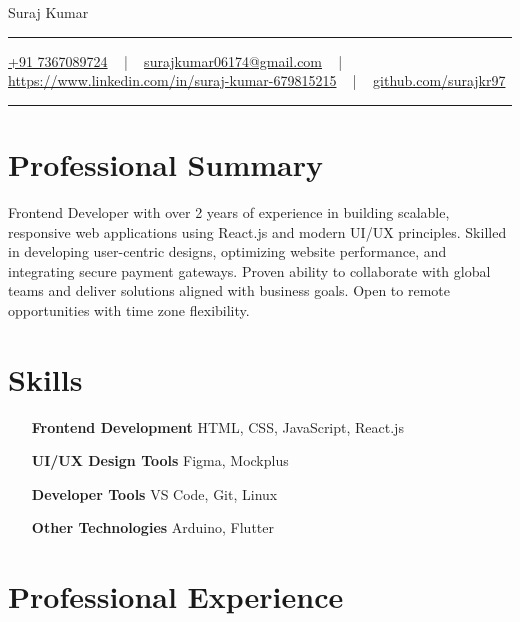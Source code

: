\documentclass[letterpaper,10pt]{article}
\newcommand{\documentTitle}[2]{
  \begin{center}
    {\Huge\color{accentTitle} #1}
    \vspace{10pt}
    {\color{accentLine} \hrule}
    \vspace{2pt}
    \footnotesize{#2}
    \vspace{2pt}
    {\color{accentLine} \hrule}
  \end{center}
}
\begin{document}
\documentTitle{Suraj Kumar}{
    \href{tel:+917367089724}{
      \raisebox{-0.05\height}{\faPhone} +91 7367089724} ~ | ~
    \href{mailto:surajkumar06174@gmail.com}{
      \raisebox{-0.15\height}{\faEnvelope} surajkumar06174@gmail.com} ~ | ~
    \href{https://linkedin.com/in/suraj-gupta-679815215}{
      \raisebox{-0.15\height}{\faLinkedin} https://www.linkedin.com/in/suraj-kumar-679815215} ~ | ~
    \href{https://github.com/surajkr97}{
      \raisebox{-0.15\height}{\faGithub} github.com/surajkr97}
}

  \section{Professional Summary}
  Frontend Developer with over 2 years of experience in building scalable, responsive web applications using React.js and modern UI/UX principles. Skilled in developing user-centric designs, optimizing website performance, and integrating secure payment gateways. Proven ability to collaborate with global teams and deliver solutions aligned with business goals. Open to remote opportunities with time zone flexibility.


    \section{Skills}

  \begin{multicols}{2}
    \begin{itemize}[itemsep=-2px, parsep=1pt, leftmargin=120pt]
      \item[\textbf{Frontend Development}] HTML, CSS, JavaScript, React.js
      \item[\textbf{UI/UX Design Tools}] Figma, Mockplus
      \item[\textbf{Developer Tools}] VS Code, Git, Linux
      \item[\textbf{Other Technologies}] Arduino, Flutter
    \end{itemize}
  \end{multicols}


  \section{Professional Experience}
\end{document}
